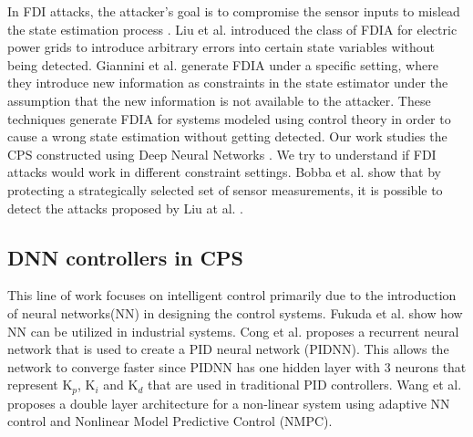 In FDI attacks, the attacker's goal is to compromise the sensor inputs to mislead the state estimation process \cite{e3f0020abba24d4389aff937fe8bcdd5}. Liu et al. \cite{10.1145/1952982.1952995} introduced the class of FDIA for electric power grids to introduce arbitrary errors into certain state variables without being detected. Giannini et al. \cite{unknown} generate FDIA under a specific setting, %
where they introduce new information as constraints in the state estimator under the assumption that the new information is not available to the attacker. These techniques generate FDIA for systems modeled using control theory in order to cause a wrong state estimation without getting detected. Our work studies the CPS constructed using Deep Neural Networks . We try to  understand if FDI attacks would work in different constraint settings.  
Bobba et al. \cite{Bobba2010DetectingFD} show that by protecting a strategically selected set of sensor measurements, it is possible to detect the attacks proposed by Liu at al. \cite{10.1145/1952982.1952995}.

\subsection{DNN controllers in CPS}
This line of work focuses on intelligent control primarily due to the introduction of neural networks(NN) in designing the control systems. %
Fukuda et al. \cite{170966} show how NN can be utilized in industrial systems. Cong et al. \cite{Cong} proposes a recurrent neural network that is used to create a PID neural network (PIDNN). This allows the network to converge faster since PIDNN has one hidden layer with 3 neurons that represent K$_p$, K$_i$ and K$_d$ that are used in traditional PID controllers. Wang et al. \cite{Wang2016ACA} proposes a double layer architecture for a non-linear system using adaptive NN control and Nonlinear Model Predictive Control (NMPC).

